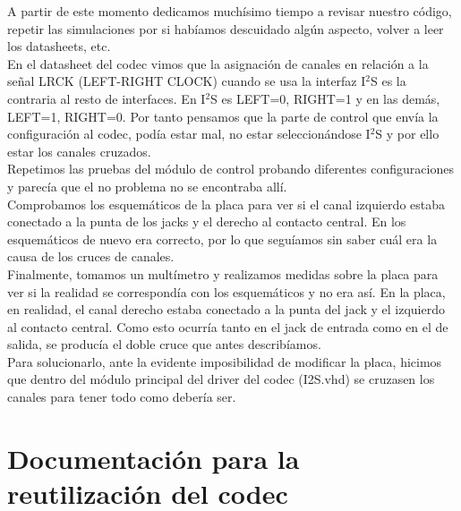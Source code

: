 A partir de este momento dedicamos muchísimo tiempo a revisar nuestro código, repetir las simulaciones por si habíamos descuidado algún aspecto, volver a leer los datasheets, etc.\\

En el datasheet del codec vimos que la asignación de canales en relación a la señal LRCK (LEFT-RIGHT CLOCK) cuando se usa la interfaz I$^2$S es la contraria al resto de interfaces. En I$^2$S es LEFT=0, RIGHT=1 y en las demás, LEFT=1, RIGHT=0. Por tanto pensamos que la parte de control que envía la configuración al codec, podía estar mal, no estar seleccionándose I$^2$S y por ello estar los canales cruzados.\\

Repetimos las pruebas del módulo de control probando diferentes configuraciones y parecía que el no problema no se encontraba allí.\\

Comprobamos los esquemáticos de la placa para ver si el canal izquierdo estaba conectado a la punta de los jacks y  el derecho al contacto central. En los esquemáticos de nuevo era correcto, por lo que seguíamos sin saber cuál era la causa de los cruces de canales.\\

Finalmente, tomamos un multímetro y realizamos medidas sobre la placa para ver si la realidad se correspondía con los esquemáticos y no era así. En la placa, en realidad, el canal derecho estaba conectado a la punta del jack y el izquierdo al contacto central. Como esto ocurría tanto en el jack de entrada como en el de salida, se producía el doble cruce que antes describíamos.\\

Para solucionarlo, ante la evidente imposibilidad de modificar la placa, hicimos que dentro del módulo principal del driver del codec (I2S.vhd) se cruzasen los canales para tener todo como debería ser.
			
		
	
\section{Documentación para la reutilización del codec}
	
